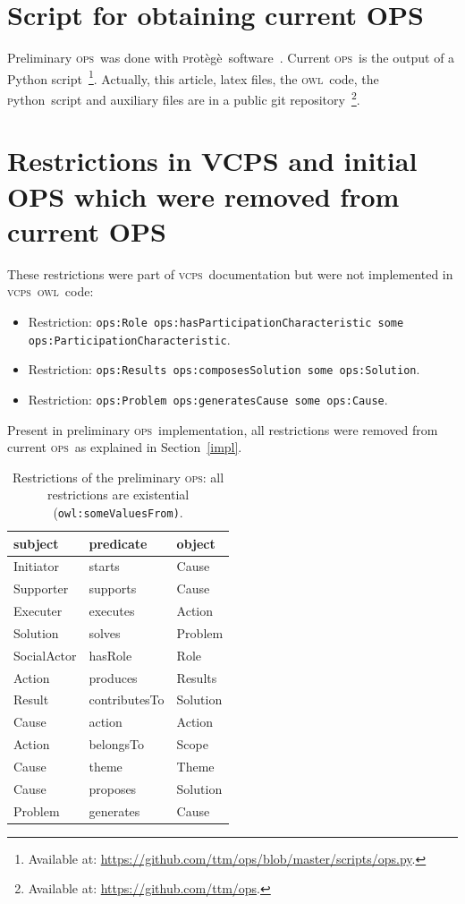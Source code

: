 \documentclass[10pt,letterpaper]{article}
\newcommand{\ops}{\textsc{ops}}
\newcommand{\vcps}{\textsc{vcps}}
\newcommand{\owl}{\textsc{owl}}
\newcommand{\python}{\textsc{p}ython}
\newcommand{\protege}{\textsc{p}rot\`eg\`e}
\begin{document}
\appendix

\section{Script for obtaining current OPS}\label{ap:script}
Preliminary \ops\ was done with \protege\ software~\cite{protege}.
Current \ops\ is the output of a Python script~\footnote{Available at: \url{https://github.com/ttm/ops/blob/master/scripts/ops.py}.}.
Actually, this article, latex files, the \owl\ code, the \python\ script 
and auxiliary files are in a public git repository~\footnote{Available at: \url{https://github.com/ttm/ops}.}.

\section{Restrictions in VCPS and initial OPS which were removed from current OPS}\label{ap:restr}
These restrictions were part of \vcps\ documentation but were not implemented in \vcps\ \owl\ code:
\begin{itemize}
    \item Restriction: {\tt ops:Role ops:hasParticipationCharacteristic some ops:ParticipationCharacteristic}.
    \item Restriction: {\tt ops:Results ops:composesSolution some ops:Solution}.
    \item Restriction: {\tt ops:Problem ops:generatesCause some ops:Cause}.
\end{itemize}

Present in preliminary \ops\ implementation,
all restrictions were removed from current \ops\ as explained in Section~\ref{impl}.
\begin{table}[!h]
  \centering
  \caption{Restrictions of the preliminary \ops: all restrictions are existential (\texttt{owl:someValuesFrom)}.}
  \begin{tabular}{|l|l|l|}\hline
{\bf subject} & {\bf predicate} & {\bf object} \\\hline\hline
Initiator    & starts        & Cause\\\hline
Supporter    & supports      & Cause\\\hline
Executer     & executes     & Action\\\hline
Solution     & solves      & Problem\\\hline
SocialActor  & hasRole            & Role\\\hline
Action       & produces    & Results\\\hline
Result       & contributesTo   & Solution\\\hline
Cause        & action          & Action\\\hline
Action       & belongsTo     & Scope\\\hline
Cause        & theme           & Theme\\\hline
Cause        & proposes   & Solution\\\hline
Problem      & generates     & Cause\\\hline
  \end{tabular}
  \label{ospRestr}
\end{table}
\end{document}

